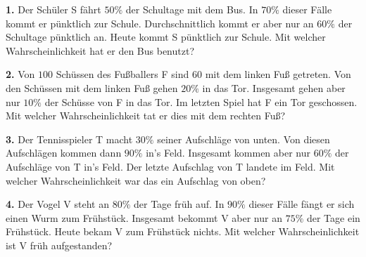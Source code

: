 \documentclass{article}
\begin{document}
\setcounter{section}{1}\setcounter{subsection}{0}

\textbf{1.} Der Sch\"uler S f\"ahrt $50\%$ der Schultage mit dem Bus. In $70\%$ dieser F\"alle kommt er p\"unktlich zur Schule. Durchschnittlich kommt er aber nur an $60\%$ der Schultage p\"unktlich an. Heute kommt S p\"unktlich zur Schule. Mit welcher Wahrscheinlichkeit hat er den Bus benutzt?

\textbf{2.} Von $100$ Sch\"ussen des Fußballers F sind $60$ mit dem linken Fuß getreten. Von den Sch\"ussen mit dem linken Fuß gehen $20\%$ in das Tor. Insgesamt gehen aber nur $10\%$ der Sch\"usse von F in das Tor. Im letzten Spiel hat F ein Tor geschossen. Mit welcher Wahrscheinlichkeit tat er dies mit dem rechten Fuß?

\textbf{3.} Der Tennisspieler T macht $30\%$ seiner Aufschl\"age von unten. Von diesen Aufschl\"agen kommen dann $90\%$ in's Feld. Insgesamt kommen aber nur $60\%$ der Aufschl\"age von T in's Feld. Der letzte Aufschlag von T landete im Feld. Mit welcher Wahrscheinlichkeit war das ein Aufschlag von oben?

\textbf{4.} Der Vogel V steht an $80\%$ der Tage fr\"uh auf. In $90\%$ dieser F\"alle f\"angt er sich einen Wurm zum Fr\"uhst\"uck. Insgesamt bekommt V aber nur an $75\%$ der Tage ein Fr\"uhst\"uck. Heute bekam V zum Fr\"uhst\"uck nichts. Mit welcher Wahrscheinlichkeit ist V fr\"uh aufgestanden? 
\end{document}
